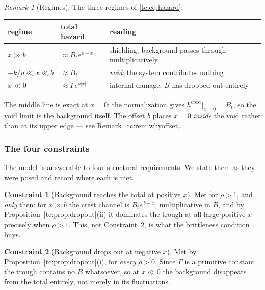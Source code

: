 \documentclass[11pt]{article}
\numberwithin{equation}{section}
\theoremstyle{plain}
\theoremstyle{definition}
\newtheorem{constraint}{Constraint}
\theoremstyle{remark}
\newtheorem{remark}[theorem]{Remark}
\begin{document}
\begin{remark}[Regimes]\label{tc:rem:regimes}
The three regimes of \eqref{tc:eq:hazard}:
\begin{center}\small
\begin{tabular}{@{}lll@{}}
\toprule
regime & total hazard & reading\\
\midrule
$x\gg b$ & $\approx B_te^{\,b-x}$ & shielding; background passes through
multiplicatively\\
$-k/\rho\ll x\ll b$ & $\approx B_t$ & \emph{void}: the system
contributes nothing\\
$x\ll0$ & $\approx\Gamma e^{\rho|x|}$ & internal damage; $B$ has dropped
out entirely\\
\bottomrule
\end{tabular}
\end{center}
The middle line is exact at $x=0$: the normalization gives
$h^{\mathrm{crest}}|_{x=0}=B_t$, so the void limit is the background
itself. The offset $b$ places $x=0$ \emph{inside} the void rather than
at its upper edge --- see Remark~\ref{tc:rem:whyoffset}.
\end{remark}

\subsubsection{The four constraints}\label{tc:subsub:constraints}

The model is answerable to four structural requirements. We state them
as they were posed and record where each is met.

\begin{constraint}[Background reaches the total at positive $x$]
\label{tc:C1}
Met for $\rho>1$, and \emph{only} then: for $x\gg b$ the crest channel
is $B_te^{\,b-x}$, multiplicative in $B$, and by
Proposition~\ref{tc:prop:dropout}(ii) it dominates the trough at all
large positive $x$ precisely when $\rho>1$. This, not
Constraint~\ref{tc:C2}, is what the brittleness condition buys.
\end{constraint}

\begin{constraint}[Background drops out at negative $x$]\label{tc:C2}
Met by Proposition~\ref{tc:prop:dropout}(i), for \emph{every} $\rho>0$.
Since $\Gamma$ is a primitive constant the trough contains no $B$
whatsoever, so at $x\ll0$ the background disappears from the total
entirely, not merely in its fluctuations.
\end{constraint}
\end{document}
